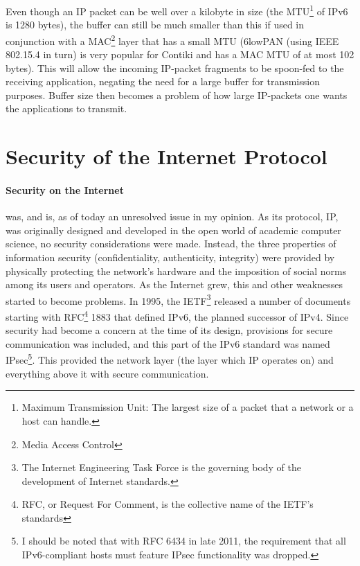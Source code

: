 \documentclass[final,a4paper,twoside,11pt,onecolumn]{report}
\begin{document}
Even though an IP packet can be well over a kilobyte in size (the MTU\footnote{Maximum Transmission Unit: The largest size of a packet that a network or a host can handle.} of IPv6 is 1280 bytes), the buffer can still be much smaller than this if used in conjunction with a MAC\footnote{Media Access Control} layer that has a small MTU (6lowPAN (using IEEE 802.15.4 in turn) is very popular for Contiki and has a MAC MTU of at most 102 bytes\citep[section 4]{rfc4944}). This will allow the incoming IP-packet fragments to be spoon-fed to the receiving application, negating the need for a large buffer for transmission purposes. Buffer size then becomes a problem of how large IP-packets one wants the applications to transmit.

\section{Security of the Internet Protocol}
\paragraph{Security on the Internet} was, and is, as of today an unresolved issue in my opinion. As its protocol, IP, was originally designed and developed in the open world of academic computer science, no security considerations were made. Instead, the three properties of information security (confidentiality, authenticity, integrity) \citep[section 8.1]{vasseur10interconnecting} were provided by physically protecting the network's hardware and the imposition of social norms among its users and operators. As the Internet grew, this and other weaknesses started to become problems. In 1995, the IETF\footnote{The Internet Engineering Task Force is the governing body of the development of Internet standards.} released a number of documents starting with RFC\footnote{RFC, or Request For Comment, is the collective name of the IETF's standards} 1883\cite{rfc1883} that defined IPv6, the planned successor of IPv4. Since security had become a concern at the time of its design, provisions for secure communication was included, and this part of the IPv6 standard was named IPsec\footnote{I should be noted that with RFC 6434\cite{rfc6434} in late 2011, the requirement that all IPv6-compliant hosts must feature IPsec functionality was dropped.}. This provided the network layer (the layer which IP operates on) and everything above it with secure communication.

\end{document}
